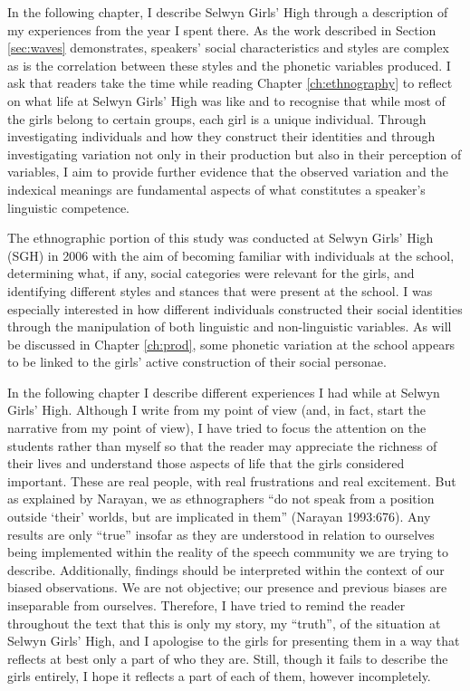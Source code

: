 In the following chapter, I describe Selwyn Girls' High through a description of my experiences from the year I spent there.  As the work described in Section \ref{sec:waves} demonstrates, speakers' social characteristics and styles are complex as is the correlation between these styles and the phonetic variables produced.  I ask that readers take the time while reading Chapter \ref{ch:ethnography} to reflect on what life at Selwyn Girls' High was like and to recognise that while most of the girls belong to certain groups, each girl is a unique individual.  Through investigating individuals and how they construct their identities and through investigating variation not only in their production but also in their perception of variables, I aim to provide further evidence that the observed variation and the indexical meanings are fundamental aspects of what constitutes a speaker's linguistic competence.


The ethnographic portion of this study was conducted at Selwyn Girls' High (SGH) in 2006 with the aim of becoming familiar with individuals at the school, determining what, if any, social categories were relevant for the girls, and identifying different styles and stances that were present at the school.  I was especially interested in how different individuals constructed their social identities through the manipulation of both linguistic and non-linguistic variables.  As will be discussed in Chapter \ref{ch:prod}, some phonetic variation at the school appears to be linked to the girls' active construction of their social personae.  

In the following chapter I describe different experiences I had while at Selwyn Girls' High.  Although I write from my point of view (and, in fact, start the narrative from my point of view), I have tried to focus the attention on the students rather than myself so that the reader may appreciate the richness of their lives and understand those aspects of life that the girls considered important.  These are real people, with real frustrations and real excitement.  But as explained by Narayan, we as ethnographers ``do not speak from a position outside `their' worlds, but are implicated in them'' (Narayan 1993:676).  Any results are only ``true'' insofar as they are understood in relation to ourselves being implemented within the reality of the speech community we are trying to describe.  Additionally, findings should be interpreted within the context of our biased observations.  We are not objective; our presence and previous biases are inseparable from ourselves.  Therefore, I have tried to remind the reader throughout the text that this is only my story, my ``truth'', of the situation at Selwyn Girls' High, and I apologise to the girls for presenting them in a way that reflects at best only a part of who they are.  Still, though it fails to describe the girls entirely, I hope it reflects a part of each of them, however incompletely. \nocite{narayan1993}

